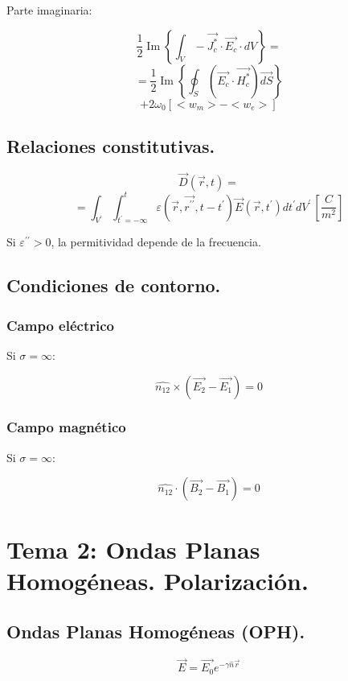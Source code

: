 \documentclass[12pt,a4paper]{article}
\begin{document}
Parte imaginaria:

\[ \frac{1}{2} \operatorname{Im}\left\{ \int_V - \vec{J_{c}^*} \cdot
\vec{E_c} \cdot dV \right\} = \]
\[ = \frac{1}{2} \operatorname{Im}\left\{ \oint_S \left(\vec{E_{c}} \cdot
\vec{H_c^*} \right) \vec{dS} \right\} \] 
\[ +2\omega_0 [<w_m>-<w_e>] \]

\subsection{Relaciones constitutivas.}

\[ \vec{D} (\vec{r}, t) = \]
\[ = \int_{V^{\prime}} \int_{t^{\prime}=-\infty}^{t}
\varepsilon (\vec{r}, \vec{r^{\prime\prime}}, t-t^{\prime})
\vec{E} (\vec{r}, t^{\prime}) dt^{\prime} dV^{\prime}
\, \left[\frac{C}{m^2} \right] \]

Si $ \varepsilon^{\prime\prime} > 0 $, la permitividad depende de la
frecuencia.

\subsection{Condiciones de contorno.}

\subsubsection{Campo eléctrico}

Si $ \sigma = \infty $:

\[ \hat{n_{12}} \times ( \vec{E_2} - \vec{E_1} ) = 0 \]

\subsubsection{Campo magnético}

Si $ \sigma = \infty $:

\[ \hat{n_{12}} \cdot ( \vec{B_2} - \vec{B_1} ) = 0 \]


\section{Tema 2: Ondas Planas Homogéneas. Polarización.}

\subsection{Ondas Planas Homogéneas (OPH).}

\[ \vec{E} = \vec{E_0} e^{-\gamma \hat{n} \vec{r}} \]
\end{document}
